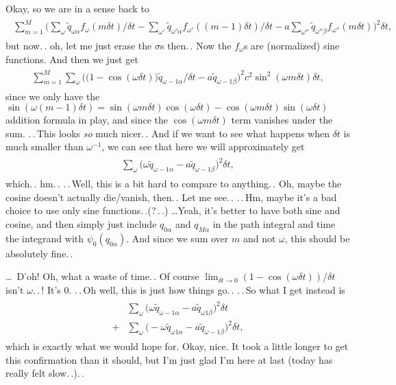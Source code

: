 \documentclass{report}
\begin{document}
Okay, so we are in a sense back to 
\begin{align}
\begin{aligned}
	\sum_{m=1}^{M}
		\bigg( 
			\sum_{\omega} 
				\tilde q_{\omega\alpha}
				f_{\omega}(m\delta t) 
				/ \delta t 
			- 
			\sum_{\omega'} 
				\tilde q_{\omega'\alpha}
				f_{\omega'}((m-1) \delta t) 
			 	/ \delta t 
			- 
			a \sum_{\omega''} 
				\tilde q_{\omega''\beta}
				f_{\omega''}(m \delta t) 
		\bigg)^2 
		\delta t,
\end{aligned}
\end{align}
but now.\,. oh, let me just erase the $\sigma$s then.\,. Now the $f_\omega$s are (normalized) sine functions. And then we just get
\begin{align}
\begin{aligned}
	\sum_{m=1}^{M} \sum_{\omega}
		\Big(
			\big(1 - \cos(\omega\delta t)\big) \tilde q_{\omega-1\alpha}  / \delta t -
			a \tilde q_{\omega-1\beta}
		\Big)^2 
		c^2 \sin^2(\omega m \delta t)
		\delta t,
\end{aligned}
\end{align}
since we only have the $\sin(\omega (m-1)\delta t) = \sin(\omega m \delta t)\cos(\omega \delta t) - \cos(\omega m \delta t)\sin(\omega \delta t)$ addition formula in play, and since the $\cos(\omega m \delta t)$ term vanishes under the sum. .\,.\,This looks \emph{so} much nicer.\,. And if we want to see what happens when $\delta t$ is much smaller than $\omega^{-1}$, we can see that here we will approximately get
\begin{align}
\begin{aligned}
	\sum_{\omega}
		\Big(
			\omega \tilde q_{\omega-1\alpha} -
			a \tilde q_{\omega-1\beta}
		\Big)^2 
		\delta t,
\end{aligned}
\end{align}
which.\,. hm.\,. .\,.\,Well, this is a bit hard to compare to anything.\,. Oh, maybe the cosine doesn't actually die/vanish, then.\,. Let me see.\,. .\,.\,Hm, maybe it's a bad choice to use only sine functions.\,.(?\,.\,.) \ldots Yeah, it's better to have both sine and cosine, and then simply just include $q_{0\alpha}$ and $q_{M\alpha}$ in the path integral and time the integrand with $\psi_0(q_{0\alpha})$. And since we sum over $m$ and not $\omega$, this should be absolutely fine.\,. 

\ldots\ D'oh! Oh, what a waste of time.\,. Of course $\lim_{\delta t\to 0}(1-\cos(\omega \delta t)) / \delta t$ isn't $\omega$.\,.\,! It's 0. .\,.\,Oh well, this is just how things go.\,. 
.\,.\,So what I get instead is
\begin{align}
\begin{aligned}
	&\sum_{\omega}
		\Big(
			\omega \tilde q_{\omega-1\alpha} -
			a \tilde q_{\omega 1\beta}
		\Big)^2 
		\delta t\\
	+&\sum_{\omega}
		\Big(
			-\omega \tilde q_{\omega 1\alpha} -
			a \tilde q_{\omega-1\beta}
		\Big)^2 
		\delta t,
\end{aligned}
\end{align}
which is exactly what we would hope for. Okay, nice. It took a little longer to get this confirmation than it should, but I'm just glad I'm here at last (today has really felt slow.\,.).\,. 
\end{document}
